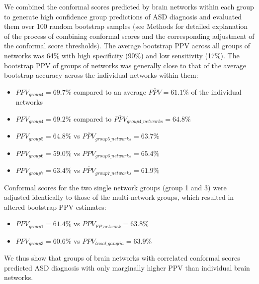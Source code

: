 \documentclass[9pt,lineno]{elife}
\begin{document}
We combined the conformal scores predicted by brain networks within each group to generate high confidence group predictions of ASD diagnosis and evaluated them over 100 random bootstrap samples (see Methods for detailed explanation of the process of combining conformal scores and the corresponding adjustment of the conformal score thresholds). The average bootstrap PPV across all groups of networks was 64\% with high specificity (90\%) and low sensitivity (17\%). The bootstrap PPV of groups of networks was generally close to that of the average bootstrap accuracy across the individual networks within them:
\begin{itemize}
    \item $PPV_{group 4} = 69.7\%$ compared to an average $\overline{PPV} = 61.1\%$ of the individual networks
    \item $PPV_{group 4} = 69.2\%$ compared to $\overline{PPV}_{group4\_networks} = 64.8\%$
    \item $PPV_{group 5} = 64.8\%$ vs $\overline{PPV}_{group5\_networks} = 63.7\%$
    \item $PPV_{group 6} = 59.0\%$ vs $PPV_{group6\_networks} = 65.4\%$
    \item $PPV_{group 7} = 63.4\%$ vs $\overline{PPV}_{group7\_networks} = 61.9\%$
\end{itemize}
Conformal scores for the two single network groups (group 1 and 3) were adjusted identically to those of the multi-network groups, which resulted in altered bootstrap PPV estimates:
\begin{itemize}
     \item $PPV_{group 1} = 61.4\%$ vs $PPV_{FP\_network} = 63.8\%$
     \item $PPV_{group 3} = 60.6\%$ vs $PPV_{basal\_ganglia} = 63.9\%$ 
\end{itemize}
We thus show that groups of brain networks with correlated conformal scores predicted ASD diagnosis with only marginally higher PPV than individual brain networks.
\end{document}
